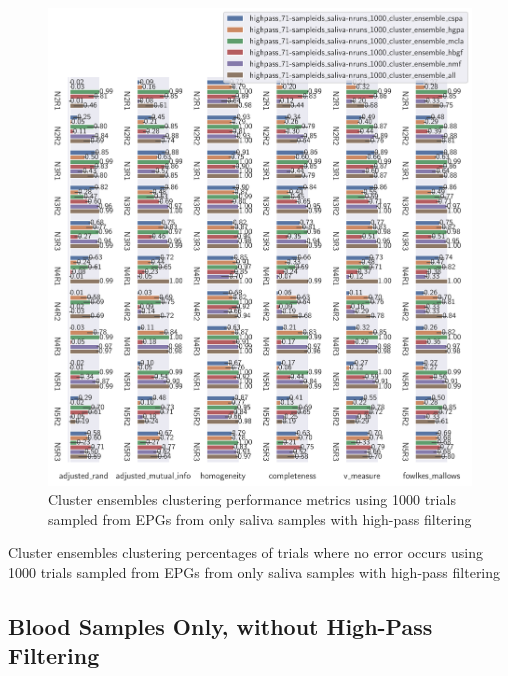 \begin{theappendices}
\begin{figure}[htbp]
\centering
\includegraphics[width=\textwidth]{./figures/clust_comparison/highpass_71-sampleids_saliva-nruns_1000_cluster_ensembles.pdf}
\caption{Cluster ensembles clustering performance metrics using 1000 trials sampled from EPGs from only saliva samples with high-pass filtering}
\label{appendix:fig:highpass_71-sampleids_saliva-nruns_1000_cluster_ensembles}
\end{figure}

\begin{table}[htbp]
\centering
{}
\caption{Cluster ensembles clustering percentages of trials where no error occurs using 1000 trials sampled from EPGs from only saliva samples with high-pass filtering}
\label{appendix:table:highpass_71-sampleids_saliva-nruns_1000_cluster_ensembles}
\end{table}

\FloatBarrier
\subsection{Blood Samples Only, without High-Pass Filtering}


\end{theappendices}
